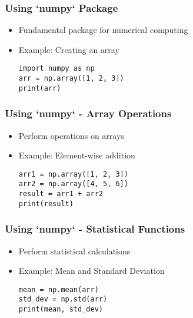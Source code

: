 \documentclass{beamer}
\begin{document}
\begin{frame}
    \frametitle{Using `numpy` Package}
    \begin{itemize}
        \item Fundamental package for numerical computing
        \item Example: Creating an array
        \begin{tcolorbox}[colback=lightblue, colframe=darkblue, title=Create Array]
            \lstinline|import numpy as np| \\
            \lstinline|arr = np.array([1, 2, 3])| \\
            \lstinline|print(arr)|
        \end{tcolorbox}
    \end{itemize}
\end{frame}

\begin{frame}
    \frametitle{Using `numpy` - Array Operations}
    \begin{itemize}
        \item Perform operations on arrays
        \item Example: Element-wise addition
        \begin{tcolorbox}[colback=lightblue, colframe=darkblue, title=Array Addition]
            \lstinline|arr1 = np.array([1, 2, 3])| \\
            \lstinline|arr2 = np.array([4, 5, 6])| \\
            \lstinline|result = arr1 + arr2| \\
            \lstinline|print(result)|
        \end{tcolorbox}
    \end{itemize}
\end{frame}

\begin{frame}
    \frametitle{Using `numpy` - Statistical Functions}
    \begin{itemize}
        \item Perform statistical calculations
        \item Example: Mean and Standard Deviation
        \begin{tcolorbox}[colback=lightblue, colframe=darkblue, title=Statistics]
            \lstinline|mean = np.mean(arr)| \\
            \lstinline|std_dev = np.std(arr)| \\
            \lstinline|print(mean, std_dev)|
        \end{tcolorbox}
    \end{itemize}
\end{frame}
\end{document}
